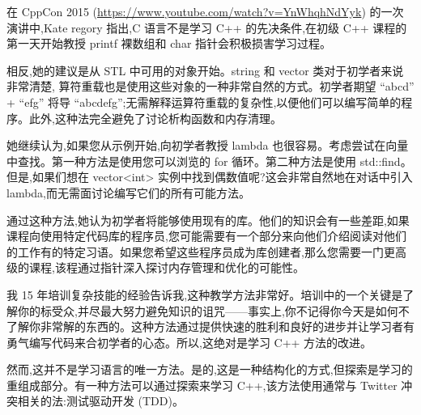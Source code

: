 在 CppCon 2015 (\url{https://www.youtube.com/watch?v=YnWhqhNdYyk}) 的一次演讲中,Kate regory 指出,C 语言不是学习 C++ 的先决条件,在初级 C++ 课程的第一天开始教授 printf 裸数组和 char 指针会积极损害学习过程。

相反,她的建议是从 STL 中可用的对象开始。string 和 vector 类对于初学者来说非常清楚, 算符重载也是使用这些对象的一种非常自然的方式。初学者期望 “abcd” + “efg” 将导 “abcdefg”;无需解释运算符重载的复杂性,以便他们可以编写简单的程序。此外,这种法完全避免了讨论析构函数和内存清理。

她继续认为,如果您从示例开始,向初学者教授 lambda 也很容易。考虑尝试在向量中查找。第一种方法是使用您可以浏览的 for 循环。第二种方法是使用 std::find。但是,如果们想在 vector<int> 实例中找到偶数值呢?这会非常自然地在对话中引入 lambda,而无需面讨论编写它们的所有可能方法。

通过这种方法,她认为初学者将能够使用现有的库。他们的知识会有一些差距,如果课程向使用特定代码库的程序员,您可能需要有一个部分来向他们介绍阅读对他们的工作有的特定习语。如果您希望这些程序员成为库创建者,那么您需要一门更高级的课程,该程通过指针深入探讨内存管理和优化的可能性。

我 15 年培训复杂技能的经验告诉我,这种教学方法非常好。培训中的一个关键是了解你的标受众,并尽最大努力避免知识的诅咒——事实上,你不记得你今天是如何不了解你非常解的东西的。这种方法通过提供快速的胜利和良好的进步并让学习者有勇气编写代码来合初学者的心态。所以,这绝对是学习 C++ 方法的改进。

然而,这并不是学习语言的唯一方法。是的,这是一种结构化的方式,但探索是学习的重组成部分。有一种方法可以通过探索来学习 C++,该方法使用通常与 Twitter 冲突相关的法:测试驱动开发 (TDD)。